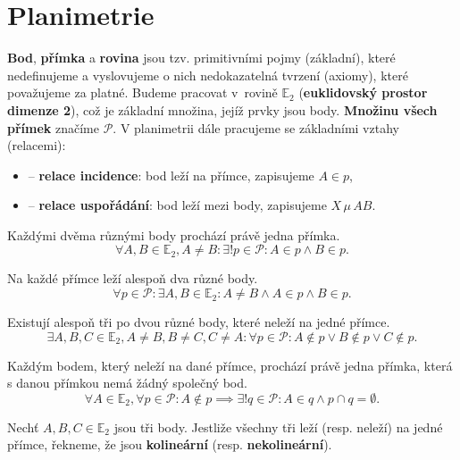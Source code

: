 \section{Planimetrie}

\begin{pozn}
  \textbf{Bod}, \textbf{přímka} a \textbf{rovina} jsou tzv. primitivními pojmy (základní), které nedefinujeme a vyslovujeme o nich nedokazatelná tvrzení (axiomy),
  které považujeme za platné. Budeme pracovat v rovině $\mathbb E_2$ (\textbf{euklidovský prostor dimenze 2}),
  což je základní množina, jejíž prvky jsou body. \textbf{Množinu všech přímek} značíme $\mathscr P$.
  V planimetrii dále pracujeme se základními vztahy (relacemi):
  \begin{itemize}
    \item {} -- \textbf{relace incidence}: bod leží na přímce, zapisujeme $A \in p$,
    \item {} -- \textbf{relace uspořádání}: bod leží mezi body, zapisujeme $X \, \mu \, AB$.
  \end{itemize}
\end{pozn}

\begin{axiom}
  Každými dvěma různými body prochází právě jedna přímka.
  $$\forall A, B \in \mathbb E_2, A\neq B: \exists! p \in \mathscr P: A \in p \land B \in p.$$
\end{axiom}

\begin{axiom}
  Na každé přímce leží alespoň dva různé body.
  $$\forall p \in \mathscr P:\exists A,B \in \mathbb E_2: A\neq B \land A \in p \land B \in p.$$
\end{axiom}

\begin{axiom}
  Existují alespoň tři po dvou různé body, které neleží na jedné přímce.
  $$\exists A,B,C \in \mathbb E_2, A \neq B, B\neq C, C\neq A: \forall p \in \mathscr P: A \notin p \lor B \notin p \lor C \notin p.$$
\end{axiom}

\begin{axiom}
Každým bodem, který neleží na dané přímce, prochází právě jedna přímka, která s danou přímkou nemá žádný společný bod.
  $$\forall A \in \mathbb E_2, \forall p \in \mathscr P: A \notin p \implies \exists! q \in \mathscr P: A \in q \land p \cap q = \emptyset.$$
\end{axiom}

\begin{definition}
  Nechť $A,B,C\in \mathbb E_2$ jsou tři body. Jestliže všechny tři leží (resp. neleží) na jedné přímce, řekneme, že jsou \textbf{kolineární} (resp. \textbf{nekolineární}).
\end{definition}

